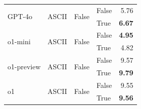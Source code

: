 \documentclass{article}
\begin{document}
\begin{table}
\begin{center}
{\begin{tabular}{@{}llllr@{}}
    \midrule
    \multirow[c]{2}{*}{GPT-4o}                                          & \multirow[c]{2}{*}{ASCII} & \multirow[c]{2}{*}{False} & False                     & 5.76 \\
                                                                        &                           &                           & True                      & \textbf{6.67} \\
    \midrule
    \multirow[c]{2}{*}{o1-mini}                                         & \multirow[c]{2}{*}{ASCII} & \multirow[c]{2}{*}{False} & False                     & \textbf{4.95} \\
                                                                        &                           &                           & True                      & 4.82 \\
    \midrule
    \multirow[c]{2}{*}{o1-preview}                                      & \multirow[c]{2}{*}{ASCII} & \multirow[c]{2}{*}{False} & False                     & 9.57 \\
                                                                        &                           &                           & True                      & \textbf{9.79} \\
    \midrule
    \multirow[c]{2}{*}{o1}                                              & \multirow[c]{2}{*}{ASCII} & \multirow[c]{2}{*}{False} & False                     & 9.55 \\
                                                                        &                           &                           & True                      & \textbf{9.56} \\
    \bottomrule
\end{tabular}
}
    \end{center}
    \label{tab:crossword-ablation}
\end{table}
\end{document}
